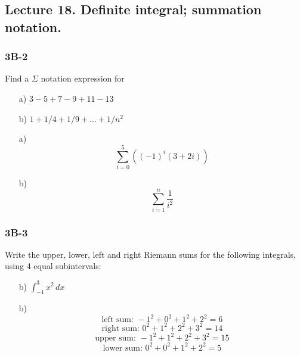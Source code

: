 \documentclass{article}
\begin{document}
\subsection{Lecture 18. Definite integral; summation notation.}

\subsubsection{3B-2}
\begin{tcolorbox}
    Find a $\Sigma$ notation expression for
    \begin{itemize}
        \item[a)] $3 - 5 + 7 - 9 + 11 - 13$
        \item[b)] $1 + 1/4 + 1/9 + \dots + 1/n^2$ 
    \end{itemize}
\end{tcolorbox}
\begin{itemize}
    \item[a)]
    \[ \sum\limits_{i=0}^{5} ((-1)^i(3+2i)) \]
    \item[b)]
    \[ \sum\limits_{i=1}^{n}\frac{1}{i^2} \]
\end{itemize}

\subsubsection{3B-3}
\begin{tcolorbox}
    Write the upper, lower, left and right Riemann sums for the following integrals, using 4 equal subintervals:
    \begin{itemize}
        \item[b)] $\int_{-1}^{3}{x^2 \, dx}$
    \end{itemize}
\end{tcolorbox}
\begin{itemize}
    \item[b)]
    \[ \text{left sum: } -1^2 + 0^2 + 1^2 + 2^2 = 6 \]
    \[ \text{right sum: } 0^2 + 1^2 + 2^2 + 3^2 = 14 \]
    \[ \text{upper sum: } -1^2 + 1^2 + 2^2 + 3^2 = 15 \]
    \[ \text{lower sum: } 0^2 + 0^2 + 1^2 + 2^2 = 5 \]
\end{itemize}
\end{document}
